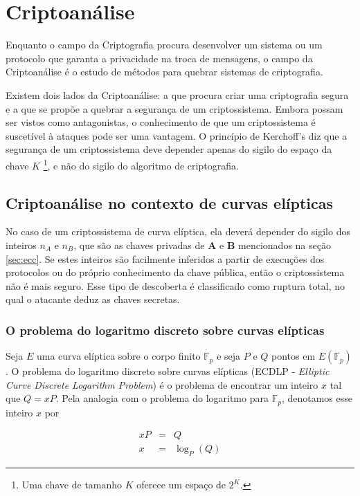 %
%
\chapter{Criptoanálise}
Enquanto o campo da Criptografia procura desenvolver um sistema ou um protocolo que garanta a privacidade na troca de mensagens, o campo da Criptoanálise é o estudo de métodos para quebrar sistemas de criptografia.

Existem dois lados da Criptoanálise: a que procura criar uma criptografia segura e a que se propõe a quebrar a segurança de um criptossistema. Embora possam ser vistos como antagonistas, o conhecimento de que um criptossistema é suscetível à ataques pode ser uma vantagem. O princípio de Kerchoff's diz que a segurança de um criptossistema deve depender apenas do sigilo do espaço da chave \(K\) \footnote{Uma chave de tamanho \(K\) oferece um espaço de \(2^K\).}, e não do sigilo do algoritmo de criptografia. \cite{Mandy:2007}

%
%
\section{Criptoanálise no contexto de curvas elípticas}
No caso de um criptossistema de curva elíptica, ela deverá depender do sigilo dos inteiros \(n_A\) e \(n_B\), que são as chaves privadas de \textbf{A} e \textbf{B} mencionados na seção \ref{sec:ecc}. Se estes inteiros são facilmente inferidos a partir de execuções dos protocolos ou do próprio conhecimento da chave pública, então o criptossistema não é mais seguro. Esse tipo de descoberta é classificado como ruptura total, no qual o atacante deduz as chaves secretas. \cite{Knudsen:1998}

%
%
\subsection{O problema do logaritmo discreto sobre curvas elípticas} \label{ecdlp}
Seja \(E\) uma curva elíptica sobre o corpo finito $\mathbb{F}_p$ e seja \(P\) e \(Q\) pontos em $E(\mathbb{F}_p)$. O problema do logaritmo discreto sobre curvas elípticas (ECDLP - \textit{Elliptic Curve Discrete Logarithm Problem}) é o problema de encontrar um inteiro \(x\) tal que $Q = xP$. Pela analogia com o problema do logaritmo para $\mathbb{F}_p$, denotamos esse inteiro \(x\) por

\begin{eqnarray}
xP &=& Q \label{eq:ecdlp1} \\
x &=& \log_P(Q) \label{eq:ecdlp2}
\end{eqnarray}


